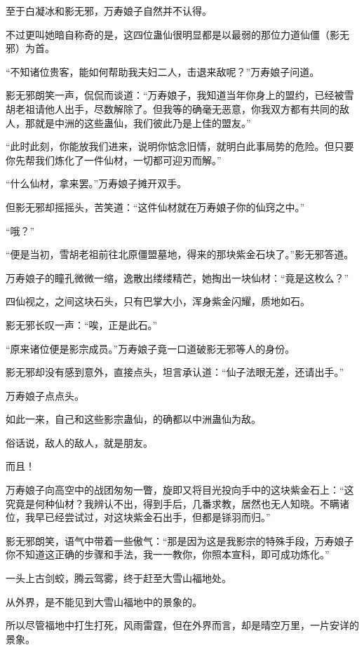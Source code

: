 \begin{this_body}
至于白凝冰和影无邪，万寿娘子自然并不认得。

不过更叫她暗自称奇的是，这四位蛊仙很明显都是以最弱的那位力道仙僵（影无邪）为首。

“不知诸位贵客，能如何帮助我夫妇二人，击退来敌呢？”万寿娘子问道。

影无邪朗笑一声，侃侃而谈道：“万寿娘子，我知道当年你身上的盟约，已经被雪胡老祖请他人出手，尽数解除了。但我等的确毫无恶意，你我双方都有共同的敌人，那就是中洲的这些蛊仙，我们彼此乃是上佳的盟友。”

“此时此刻，你能放我们进来，说明你惦念旧情，就明白此事局势的危险。但只要你先帮我们炼化了一件仙材，一切都可迎刃而解。”

“什么仙材，拿来罢。”万寿娘子摊开双手。

但影无邪却摇摇头，苦笑道：“这件仙材就在万寿娘子你的仙窍之中。”

“哦？”

“便是当初，雪胡老祖前往北原僵盟墓地，得来的那块紫金石块了。”影无邪答道。

万寿娘子的瞳孔微微一缩，逸散出缕缕精芒，她掏出一块仙材：“竟是这枚么？”

四仙视之，之间这块石头，只有巴掌大小，浑身紫金闪耀，质地如石。

影无邪长叹一声：“唉，正是此石。”

“原来诸位便是影宗成员。”万寿娘子竟一口道破影无邪等人的身份。

影无邪却没有感到意外，直接点头，坦言承认道：“仙子法眼无差，还请出手。”

万寿娘子点点头。

如此一来，自己和这些影宗蛊仙，的确都以中洲蛊仙为敌。

俗话说，敌人的敌人，就是朋友。

而且！

万寿娘子向高空中的战团匆匆一瞥，旋即又将目光投向手中的这块紫金石上：“这究竟是何种仙材？我辨认不出，得到手后，几番求教，居然也无人知晓。不瞒诸位，我早已经尝试过，对这块紫金石出手，但都是铩羽而归。”

影无邪朗笑，语气中带着一些傲气：“那是因为这是我影宗的特殊手段，万寿娘子你不知道这正确的步骤和手法，我一一教你，你照本宣科，即可成功炼化。”

一头上古剑蛟，腾云驾雾，终于赶至大雪山福地处。

从外界，是不能见到大雪山福地中的景象的。

所以尽管福地中打生打死，风雨雷霆，但在外界而言，却是晴空万里，一片安详的景象。


\end{this_body}
